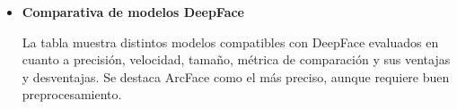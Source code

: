 \begin{itemize}
\item \textbf{Comparativa de modelos DeepFace}

La tabla muestra distintos modelos compatibles con DeepFace evaluados en cuanto a precisión, velocidad, tamaño, métrica de comparación y sus ventajas y desventajas. Se destaca ArcFace como el más preciso, aunque requiere buen preprocesamiento.


\begin{table}[H]
    \centering
    \caption{Comparativa de modelos de DeepFace\cite{yolov8face2024}.}
    \label{tab:deepface1}
    \renewcommand{\arraystretch}{1.25}
\end{table}


\vspace{0.5cm}


\end{itemize}
